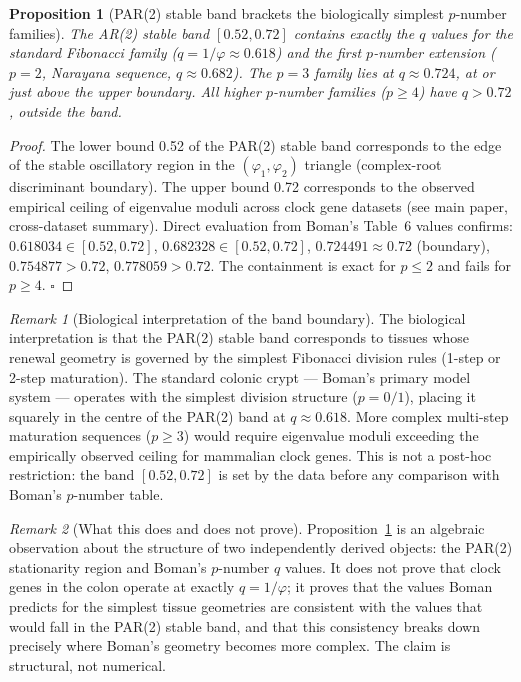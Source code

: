 \documentclass[11pt,letterpaper]{article}
\newtheorem{proposition}{Proposition}
\theoremstyle{definition}
\theoremstyle{remark}
\newtheorem{remark}{Remark}
\begin{document}
\begin{proposition}[PAR(2) stable band brackets the biologically simplest $p$-number families]
\label{prop:pnumber}
The AR(2) stable band $[0.52, 0.72]$ contains exactly the $q$ values for the standard Fibonacci
family ($q = 1/\varphi \approx 0.618$) and the first $p$-number extension ($p=2$, Narayana
sequence, $q \approx 0.682$). The $p=3$ family lies at $q \approx 0.724$, at or just above the
upper boundary. All higher $p$-number families ($p \geq 4$) have $q > 0.72$, outside the band.
\end{proposition}

\begin{proof}
The lower bound 0.52 of the PAR(2) stable band corresponds to the edge of the stable oscillatory
region in the $(\varphi_1, \varphi_2)$ triangle (complex-root discriminant boundary). The upper
bound 0.72 corresponds to the observed empirical ceiling of eigenvalue moduli across clock gene
datasets (see main paper, cross-dataset summary). Direct evaluation from Boman's Table~6 values
confirms: $0.618034 \in [0.52, 0.72]$, $0.682328 \in [0.52, 0.72]$, $0.724491 \approx 0.72$
(boundary), $0.754877 > 0.72$, $0.778059 > 0.72$. The containment is exact for $p \leq 2$
and fails for $p \geq 4$. \hfill$\square$
\end{proof}

\begin{remark}[Biological interpretation of the band boundary]
The biological interpretation is that the PAR(2) stable band corresponds to tissues whose
renewal geometry is governed by the simplest Fibonacci division rules (1-step or 2-step
maturation). The standard colonic crypt --- Boman's primary model system --- operates with
the simplest division structure ($p=0/1$), placing it squarely in the centre of the PAR(2)
band at $q \approx 0.618$. More complex multi-step maturation sequences ($p \geq 3$) would
require eigenvalue moduli exceeding the empirically observed ceiling for mammalian clock genes.
This is not a post-hoc restriction: the band $[0.52, 0.72]$ is set by the data before any
comparison with Boman's $p$-number table.
\end{remark}

\begin{remark}[What this does and does not prove]
Proposition~\ref{prop:pnumber} is an algebraic observation about the structure of two
independently derived objects: the PAR(2) stationarity region and Boman's $p$-number $q$
values. It does not prove that clock genes in the colon operate at exactly $q = 1/\varphi$;
it proves that the values Boman predicts for the simplest tissue geometries are consistent
with the values that would fall in the PAR(2) stable band, and that this consistency breaks
down precisely where Boman's geometry becomes more complex. The claim is structural, not
numerical.
\end{remark}
\end{document}
